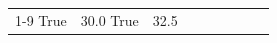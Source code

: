 \begin{table}[H]
\begin{tabular}{lllrlllll}
\cline{1-9}
True & 30.0%
\cline{1-9}
True & 32.5%

\end{tabular}
\end{table}
